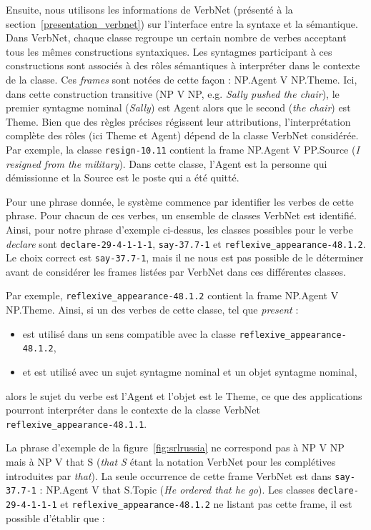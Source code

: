 Ensuite, nous utilisons les informations de VerbNet (présenté à la
section~\ref{presentation_verbnet}) sur l'interface entre la syntaxe et la
sémantique. Dans VerbNet, chaque classe regroupe un certain nombre de verbes
acceptant tous les mêmes constructions syntaxiques. Les syntagmes participant à
ces constructions sont associés à des rôles sémantiques à interpréter dans le
contexte de la classe. Ces \textit{frames} sont notées de cette façon :
NP.Agent V NP.Theme. Ici, dans cette construction transitive (NP V NP, e.g.
\textit{Sally pushed the chair}), le premier syntagme nominal (\textit{Sally})
est Agent alors que le second (\textit{the chair}) est Theme.  Bien que des
règles précises régissent leur attributions, l'interprétation complète des
rôles (ici Theme et Agent) dépend de la classe VerbNet considérée. Par exemple,
la classe \texttt{resign-10.11} contient la frame NP.Agent V PP.Source
(\textit{I resigned from the military}). Dans cette classe, l'Agent est la
personne qui démissionne et la Source est le poste qui a été quitté.

Pour une phrase donnée, le système commence par identifier les verbes de cette
phrase. Pour chacun de ces verbes, un ensemble de classes VerbNet est
identifié. Ainsi, pour notre phrase d'exemple ci-dessus, les classes possibles
pour le verbe \textit{declare} sont \texttt{declare-29-4-1-1-1},
\texttt{say-37.7-1} et \texttt{reflexive\_appearance-48.1.2}. Le choix correct
est \texttt{say-37.7-1}, mais il ne nous est pas possible de le déterminer
avant de considérer les frames listées par VerbNet dans ces différentes
classes.

Par exemple, \texttt{reflexive\_appearance-48.1.2} contient la frame NP.Agent V
NP.Theme. Ainsi, si un des verbes de cette classe, tel que \textit{present} :
\begin{itemize}
    \item est utilisé dans un sens compatible avec la classe
        \texttt{reflexive\_appearance-48.1.2},
    \item et est utilisé avec un sujet syntagme nominal et un objet syntagme
        nominal,
\end{itemize}
alors le sujet du verbe est l'Agent et l'objet est le Theme, ce que des
applications pourront interpréter dans le contexte de la classe VerbNet
\texttt{reflexive\_appearance-48.1.1}.

La phrase d'exemple de la figure~\ref{fig:srlrussia} ne correspond pas à NP V
NP mais à NP V that S (\textit{that S} étant la notation VerbNet pour les
complétives introduites par \textit{that}). La seule occurrence de cette frame
VerbNet est dans \texttt{say-37.7-1} : NP.Agent V that S.Topic (\textit{He
ordered that he go}). Les classes \texttt{declare-29-4-1-1-1} et
\texttt{reflexive\_appearance-48.1.2} ne listant pas cette frame, il est
possible d'établir que :

